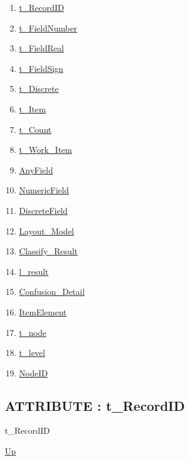 \par
\par
\begin{enumerate}
\item \hyperlink{ecldoc:ml_core.types.t_recordid}{t\_RecordID}
\item \hyperlink{ecldoc:ml_core.types.t_fieldnumber}{t\_FieldNumber}
\item \hyperlink{ecldoc:ml_core.types.t_fieldreal}{t\_FieldReal}
\item \hyperlink{ecldoc:ml_core.types.t_fieldsign}{t\_FieldSign}
\item \hyperlink{ecldoc:ml_core.types.t_discrete}{t\_Discrete}
\item \hyperlink{ecldoc:ml_core.types.t_item}{t\_Item}
\item \hyperlink{ecldoc:ml_core.types.t_count}{t\_Count}
\item \hyperlink{ecldoc:ml_core.types.t_work_item}{t\_Work\_Item}
\item \hyperlink{ecldoc:ml_core.types.anyfield}{AnyField}
\item \hyperlink{ecldoc:ml_core.types.numericfield}{NumericField}
\item \hyperlink{ecldoc:ml_core.types.discretefield}{DiscreteField}
\item \hyperlink{ecldoc:ml_core.types.layout_model}{Layout\_Model}
\item \hyperlink{ecldoc:ml_core.types.classify_result}{Classify\_Result}
\item \hyperlink{ecldoc:ml_core.types.l_result}{l\_result}
\item \hyperlink{ecldoc:ml_core.types.confusion_detail}{Confusion\_Detail}
\item \hyperlink{ecldoc:ml_core.types.itemelement}{ItemElement}
\item \hyperlink{ecldoc:ml_core.types.t_node}{t\_node}
\item \hyperlink{ecldoc:ml_core.types.t_level}{t\_level}
\item \hyperlink{ecldoc:ml_core.types.nodeid}{NodeID}
\end{enumerate}
\subsection*{ATTRIBUTE : t\_RecordID}
\hypertarget{ecldoc:ml_core.types.t_recordid}{}
\begin{minipage}[t]{\textwidth}
\begin{flushleft}
 t\_RecordID 
\end{flushleft}
\end{minipage}
\hyperlink{ecldoc:ML_Core.Types}{Up}

